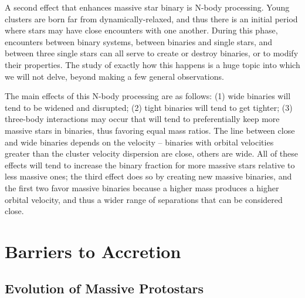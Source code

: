 A second effect that enhances massive star binary is N-body processing. Young clusters are born far from dynamically-relaxed, and thus there is an initial period where stars may have close encounters with one another. During this phase, encounters between binary systems, between binaries and single stars, and between three single stars can all serve to create or destroy binaries, or to modify their properties. The study of exactly how this happens is a huge topic into which we will not delve, beyond making a few general observations.

The main effects of this N-body processing are as follows: (1) wide binaries will tend to be widened and disrupted; (2) tight binaries will tend to get tighter; (3) three-body interactions may occur that will tend to preferentially keep more massive stars in binaries, thus favoring equal mass ratios. The line between close and wide binaries depends on the velocity -- binaries with orbital velocities greater than the cluster velocity dispersion are close, others are wide. All of these effects will tend to increase the binary fraction for more massive stars relative to less massive ones; the third effect does so by creating new massive binaries, and the first two favor massive binaries because a higher mass produces a higher orbital velocity, and thus a wider range of separations that can be considered close.

\section{Barriers to Accretion}

\subsection{Evolution of Massive Protostars}

